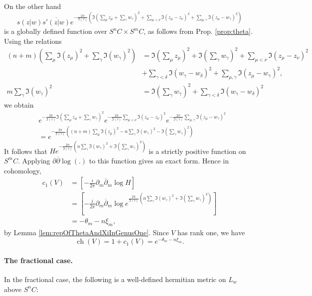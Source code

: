 \documentclass{article}
\theoremstyle{definition}
\DeclareMathOperator{\ch}{ch}
\newcommand{\ov}[1]{\overline{#1}}
\begin{document}
On the other hand 
$$s(z|w) \ov{s'(z|w)} e^{-\frac{2\pi}{\Im(\tau)} \left( \Im(\sum_\mu z_\mu+\sum_\gamma w_\gamma)^2+\sum_{\mu<\nu}\Im(z_\mu-z_\nu)^2 +\sum_{\mu,\gamma} \Im(z_\mu-w_\gamma)^2\right)}$$
is a globally defined function over $S^n C\times S^mC$, as follows from Prop. \ref{prop:theta}. Using the relations
\begin{align*}
(n+m)\left( \sum_\mu \Im(z_\mu)^2 + \sum_\gamma \Im(w_\gamma)^2 \right)&=\Im(\sum_\mu z_\mu)^2+\Im(\sum_\gamma w_\gamma)^2+ \sum_{\mu< \nu} \Im(z_\mu-z_\nu)^2\\
&+\sum_{\gamma< \delta} \Im(w_\gamma-w_\delta)^2+\sum_{\mu,\gamma} \Im(z_\mu-w_\gamma)^2,\\
m\sum_\gamma\Im(w_\gamma)^2&=\Im(\sum_\gamma w_\gamma)^2+ \sum_{\gamma< \delta} \Im(w_\gamma-w_\delta)^2
\end{align*}
we obtain
\begin{align}\label{exprel}\nonumber
   &e^{-\frac{2\pi}{\Im(\tau)}\Im (\sum_\mu z_\mu + \sum_\gamma w_\gamma)^2} e^{-\frac{2\pi}{\Im(\tau)} \sum_{\mu< \nu} \Im(z_\mu-z_\nu)^2} e^{-\frac{2\pi}{\Im(\tau)} \sum_{\mu,\gamma} \Im(z_\mu - w_\gamma)^2}\\
   &=e^{-\frac{2\pi}{\Im(\tau)}\left((n+m)\sum_\mu \Im(z_\mu)^2-n\sum_\gamma \Im(w_\gamma)^2-\Im(\sum_\gamma w_\gamma)^2\right)}
\end{align} 
It follows that $He^{-\frac{2\pi}{\Im(\tau)} \left( n \sum_\gamma \Im(w_\gamma)^2  + \Im(\sum_\gamma w_\gamma)^2\right)}$ is a strictly positive function on $S^mC$. Applying $\partial \ov{\partial}\log(.)$ to this function gives an exact form. Hence in cohomology,
\begin{align*}
    c_1(V)&=\left[-\frac{i}{2\pi}\partial_m \ov{\partial}_m\log H\right]\\
    &=\left[-\frac{i}{2\pi}\partial_m \ov{\partial}_m \log e^{\frac{2\pi}{\Im(\tau)} \left( n\sum_\gamma \Im(w_\gamma)^2  + \Im(\sum_\gamma w_\gamma)^2\right)}\right]\\
    &=-\theta_m-n\xi_m,
\end{align*}
by Lemma \ref{lem:repOfThetaAndXiInGenusOne}. Since $V$ has rank one, we have $$\ch(V)=1+c_1(V)=e^{-\theta_m-n \xi_m}.$$



\paragraph{The fractional case.}

In the fractional case, the following is a well-defined hermitian metric on $L_{w}$ above $S^n C$:
\end{document}
